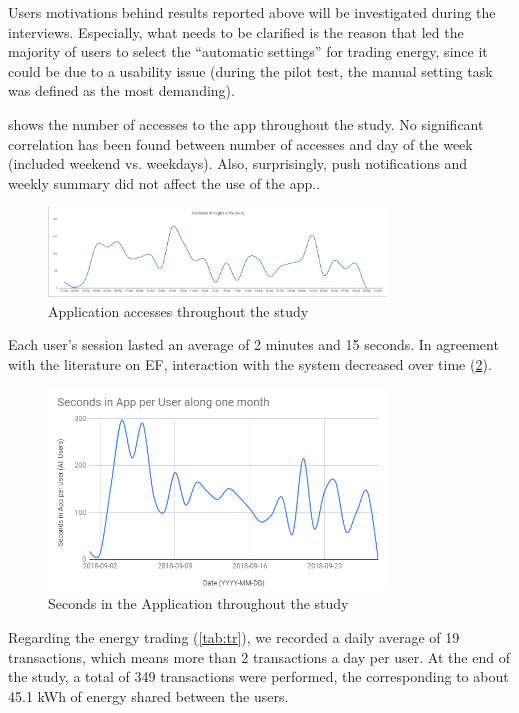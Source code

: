 Users motivations behind results reported above will be investigated during the interviews. Especially, what needs to be clarified is the reason that led the majority of users to select the “automatic settings” for trading energy, since it could be due to a usability issue (during the pilot test, the manual setting task was defined as the most demanding).  

 shows the number of accesses to the app throughout the study. No significant correlation has been found between number of accesses and day of the week (included weekend vs. weekdays). Also, surprisingly, push notifications and weekly summary did not affect the use of the app.. 


 \begin{figure}[h]
\centering
\includegraphics[width=0.8\textwidth]{./Images/graph2}
\caption{Application accesses throughout the study }
\label{fig:gr2}
\end{figure}

Each user’s session lasted an average of 2 minutes and 15 seconds. In agreement with the literature on EF, interaction with the system decreased over time (\cref{fig:gr3}). 


 \begin{figure}[h]
\centering
\includegraphics[width=0.8\textwidth]{./Images/graph3}
\caption{Seconds in the Application throughout the study}
\label{fig:gr3}
\end{figure}

Regarding the energy trading (\cref{tab:tr}), we recorded a daily average of 19 transactions, which means more than 2 transactions a day per user. 
At the end of the study, a total of 349 transactions were performed, the corresponding to about 45.1 kWh of energy shared between the users. 



